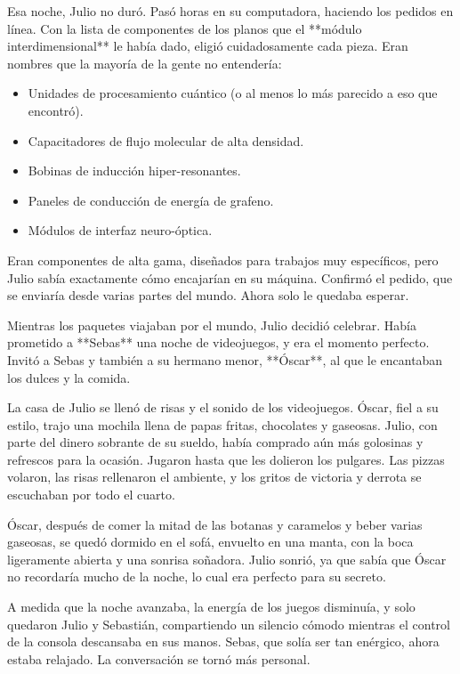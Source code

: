 \documentclass[a4paper,12pt]{book}
\begin{document}
Esa noche, Julio no duró. Pasó horas en su computadora, haciendo los pedidos en línea. Con la lista de componentes de los planos que el **módulo interdimensional** le había dado, eligió cuidadosamente cada pieza. Eran nombres que la mayoría de la gente no entendería:

\begin{itemize}
    \item Unidades de procesamiento cuántico (o al menos lo más parecido a eso que encontró).
    \item Capacitadores de flujo molecular de alta densidad.
    \item Bobinas de inducción hiper-resonantes.
    \item Paneles de conducción de energía de grafeno.
    \item Módulos de interfaz neuro-óptica.
\end{itemize}

Eran componentes de alta gama, diseñados para trabajos muy específicos, pero Julio sabía exactamente cómo encajarían en su máquina. Confirmó el pedido, que se enviaría desde varias partes del mundo. Ahora solo le quedaba esperar.

Mientras los paquetes viajaban por el mundo, Julio decidió celebrar. Había prometido a **Sebas** una noche de videojuegos, y era el momento perfecto. Invitó a Sebas y también a su hermano menor, **Óscar**, al que le encantaban los dulces y la comida.

La casa de Julio se llenó de risas y el sonido de los videojuegos. Óscar, fiel a su estilo, trajo una mochila llena de papas fritas, chocolates y gaseosas. Julio, con parte del dinero sobrante de su sueldo, había comprado aún más golosinas y refrescos para la ocasión. Jugaron hasta que les dolieron los pulgares. Las pizzas volaron, las risas rellenaron el ambiente, y los gritos de victoria y derrota se escuchaban por todo el cuarto.

Óscar, después de comer la mitad de las botanas y caramelos y beber varias gaseosas, se quedó dormido en el sofá, envuelto en una manta, con la boca ligeramente abierta y una sonrisa soñadora. Julio sonrió, ya que sabía que Óscar no recordaría mucho de la noche, lo cual era perfecto para su secreto.

A medida que la noche avanzaba, la energía de los juegos disminuía, y solo quedaron Julio y Sebastián, compartiendo un silencio cómodo mientras el control de la consola descansaba en sus manos. Sebas, que solía ser tan enérgico, ahora estaba relajado. La conversación se tornó más personal.
\end{document}
